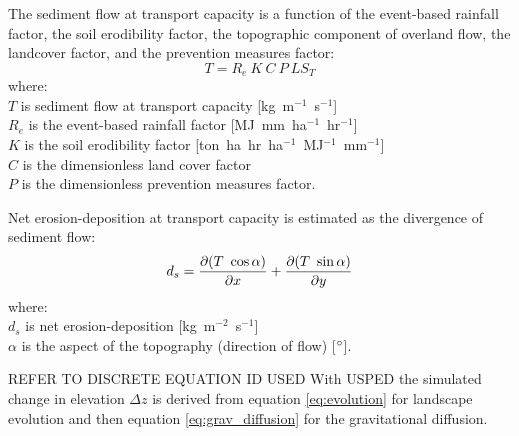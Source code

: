 \documentclass[gmd, manuscript]{copernicus}
\begin{document}
\noindent
The sediment flow at transport capacity is a function of 
the event-based rainfall factor, the soil erodibility factor, 
the topographic component of overland flow,
the landcover factor, and the prevention measures factor:
%
\begin{equation}
\label{eq:usped}
{T = R_e ~ K ~ C ~ P ~ LS_T}
\end{equation}
{\small
\noindent
where: \\
\noindent
\hspace*{0.5em} $T$ is sediment flow at transport capacity [\unit{kg~m}$^{-1}$~\unit{s}$^{-1}$]\\ 
\hspace*{0.5em} $R_e$ is the event-based rainfall factor [\unit{MJ~mm~ha}$^{-1}$~\unit{hr}$^{-1}$]\\
\hspace*{0.5em} $K$ is the soil erodibility factor [\unit{ton~ha~hr~ha}$^{-1}$~\unit{MJ}$^{-1}$~\unit{mm}$^{-1}$]\\ 
\hspace*{0.5em} $C$ is the dimensionless land cover factor\\
\hspace*{0.5em} $P$ is the dimensionless prevention measures factor.\\
}

\noindent
Net erosion-deposition at transport capacity is estimated as the divergence of sediment flow: 
\begin{equation}\label{eq:usped_erdep} 
d_s = 
{\partial (T ~ \cos \alpha) \over \partial x} +
{\partial (T ~ \sin \alpha) \over \partial y}
\end{equation}
{\small
\noindent
where: \\
\hspace*{0.5em} $d_s$ is net erosion-deposition [\unit{kg~m}$^{-2}$~\unit{s}$^{-1}$]\\
\hspace*{0.5em} $\alpha$ is the aspect of the topography (direction of flow) [$^{\circ}$].\\
}

\noindent
REFER TO DISCRETE EQUATION ID USED
With USPED the simulated change in elevation $\Delta z$
is derived from equation \ref{eq:evolution} for landscape evolution
and then equation \ref{eq:grav_diffusion}
for the gravitational diffusion.

\end{document}
